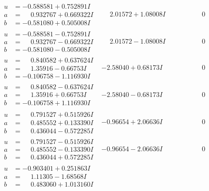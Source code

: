 \documentclass[1p]{elsarticle_modified}
\theoremstyle{definition}
\begin{document}
$$\begin{array}{c|c|c}
\begin{aligned}
u &= -0.588581 + 0.752891 I \\
a &= \phantom{-}0.932767 + 0.669322 I \\
b &= -0.581080 + 0.505008 I\end{aligned}
 & \phantom{-}2.01572 + 1.08008 I & \phantom{-0.000000 } 0 \\ \hline\begin{aligned}
u &= -0.588581 - 0.752891 I \\
a &= \phantom{-}0.932767 - 0.669322 I \\
b &= -0.581080 - 0.505008 I\end{aligned}
 & \phantom{-}2.01572 - 1.08008 I & \phantom{-0.000000 } 0 \\ \hline\begin{aligned}
u &= \phantom{-}0.840582 + 0.637624 I \\
a &= \phantom{-}1.35916 - 0.66753 I \\
b &= -0.106758 - 1.116930 I\end{aligned}
 & -2.58040 + 0.68173 I & \phantom{-0.000000 } 0 \\ \hline\begin{aligned}
u &= \phantom{-}0.840582 - 0.637624 I \\
a &= \phantom{-}1.35916 + 0.66753 I \\
b &= -0.106758 + 1.116930 I\end{aligned}
 & -2.58040 - 0.68173 I & \phantom{-0.000000 } 0 \\ \hline\begin{aligned}
u &= \phantom{-}0.791527 + 0.515926 I \\
a &= \phantom{-}0.485552 + 0.133390 I \\
b &= \phantom{-}0.436044 - 0.572285 I\end{aligned}
 & -0.96654 + 2.06636 I & \phantom{-0.000000 } 0 \\ \hline\begin{aligned}
u &= \phantom{-}0.791527 - 0.515926 I \\
a &= \phantom{-}0.485552 - 0.133390 I \\
b &= \phantom{-}0.436044 + 0.572285 I\end{aligned}
 & -0.96654 - 2.06636 I & \phantom{-0.000000 } 0 \\ \hline\begin{aligned}
u &= -0.903401 + 0.251863 I \\
a &= \phantom{-}1.11305 - 1.68568 I \\
b &= \phantom{-}0.483060 + 1.013160 I\end{aligned}

\end{array}$$
\end{document}

